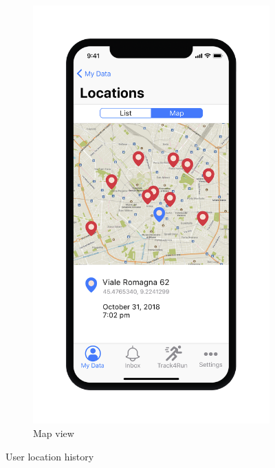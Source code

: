 \begin{figure}[H]
\begin{subfigure}{.5\textwidth}
  \includegraphics[width=.8\textwidth]{./Pictures/Mockup/mobile/location2.png}
  \captionsetup{skip=0pt}
  \caption{Map view}
  \label{fig:mobile-location2}
\end{subfigure}
\captionsetup{skip=8pt}
\caption{User location history}
\label{fig:test}
\end{figure}

